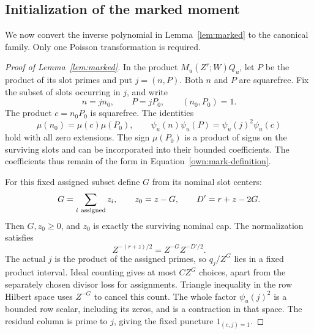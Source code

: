 \documentclass[12pt]{article}
\begin{document}
\subsection{Initialization of the marked moment}

We now convert the inverse polynomial in Lemma~\ref{lem:marked} to
the canonical family.  Only one Poisson transformation is required.

\begin{proof}[Proof of Lemma~\ref{lem:marked}]
In the product \(M_u(Z^r;W)Q_u\), let \(P\) be the product of its
slot primes and put \(j=(n,P)\).  Both \(n\) and \(P\) are
squarefree.  Fix the subset of slots occurring in \(j\), and write
\[
 n=jn_0,\qquad P=jP_0,\qquad (n_0,P_0)=1.
\]
The product \(c=n_0P_0\) is squarefree.  The identities
\[
 \mu(n_0)=\mu(c)\mu(P_0),\qquad
 \psi_u(n)\psi_u(P)=\psi_u(j)^2\psi_u(c)
\]
hold with all zero extensions.  The sign \(\mu(P_0)\) is a product
of signs on the surviving slots and can be incorporated into their
bounded coefficients.  The coefficients thus remain of the form
in Equation~\eqref{own:mark-definition}.

For this fixed assigned subset define \(G\) from its nominal slot centers:
\[
 G=\sum_{i\ {\rm assigned}}z_i,\qquad
 z_0=z-G,\qquad D'=r+z-2G.
\]
Then \(G,z_0\ge0\), and \(z_0\) is exactly the surviving nominal cap.
The normalization satisfies
\[
 Z^{-(r+z)/2}=Z^{-G}Z^{-D'/2}.
\]
The actual \(j\) is the product of the assigned primes, so
\(q_j/Z^G\) lies in a fixed product interval.  Ideal counting gives at
most \(CZ^G\) choices, apart from the separately chosen divisor loss
for assignments.  Triangle inequality in the row Hilbert space uses
\(Z^{-G}\) to cancel this count.  The whole factor \(\psi_u(j)^2\) is a
bounded row scalar, including its zeros, and is a contraction in that
space.  The residual column is prime to \(j\), giving the fixed
puncture \(1_{(c,j)=1}\).


\end{proof}
\end{document}
